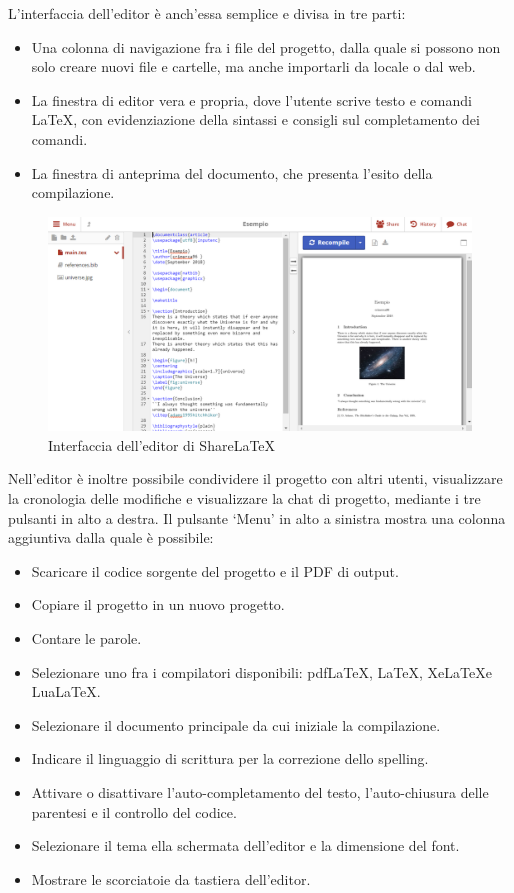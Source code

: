 L'interfaccia dell'editor è anch'essa semplice e divisa in tre parti:
\begin{itemize}
    \item Una colonna di navigazione fra i file del progetto, dalla quale si possono non solo creare nuovi file e cartelle, ma anche importarli da locale o dal web.
    \item La finestra di editor vera e propria, dove l'utente scrive testo e comandi \LaTeX, con evidenziazione della sintassi e consigli sul completamento dei comandi.
    \item La finestra di anteprima del documento, che presenta l'esito della compilazione.
\end{itemize}
\begin{figure}[h]
    \centering
    \includegraphics[width=\textwidth]{immagini/editor.PNG}
    \caption{Interfaccia dell'editor di ShareLaTeX}
    \label{fig:sharelatex_editor}
\end{figure}
Nell'editor è inoltre possibile condividere il progetto con altri utenti, visualizzare la cronologia delle modifiche e visualizzare la chat di progetto, mediante i tre pulsanti in alto a destra.
Il pulsante \enquote*{Menu} in alto a sinistra mostra una colonna aggiuntiva dalla quale è possibile:
\begin{itemize}
    \item Scaricare il codice sorgente del progetto e il PDF di output.
    \item Copiare il progetto in un nuovo progetto.
    \item Contare le parole.
    \item Selezionare uno fra i compilatori disponibili: pdf\LaTeX, \LaTeX, Xe\LaTeX e Lua\LaTeX.
    \item Selezionare il documento principale da cui iniziale la compilazione.
    \item Indicare il linguaggio di scrittura per la correzione dello spelling.
    \item Attivare o disattivare l'auto-completamento del testo, l'auto-chiusura delle parentesi e il controllo del codice.
    \item Selezionare il tema ella schermata dell'editor e la dimensione del font.
    \item Mostrare le scorciatoie da tastiera dell'editor.
\end{itemize}

